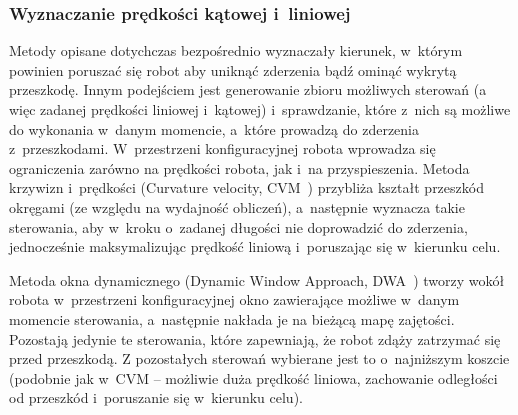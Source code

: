 \subsubsection{Wyznaczanie prędkości kątowej i~liniowej}

Metody opisane dotychczas bezpośrednio wyznaczały kierunek, w~którym powinien poruszać
się robot aby uniknąć zderzenia bądź ominąć wykrytą przeszkodę. Innym podejściem
jest generowanie zbioru możliwych sterowań (a więc zadanej prędkości liniowej i~kątowej)
i~sprawdzanie, które z~nich są możliwe do wykonania w~danym momencie, a~które prowadzą
do zderzenia z~przeszkodami. W~przestrzeni konfiguracyjnej robota wprowadza się ograniczenia
zarówno na prędkości robota, jak i~na przyspieszenia. Metoda krzywizn i~prędkości
(Curvature velocity, CVM~\cite{511023}) przybliża kształt przeszkód okręgami (ze względu na wydajność
obliczeń), a~następnie wyznacza takie sterowania, aby w~kroku o~zadanej długości
nie doprowadzić do zderzenia, jednocześnie maksymalizując prędkość liniową i~poruszając
się w~kierunku celu.

Metoda okna dynamicznego (Dynamic Window Approach, DWA~\cite{fox1997dynamic}) tworzy wokół robota w~przestrzeni
konfiguracyjnej okno zawierające możliwe w~danym momencie sterowania, a~następnie nakłada
je na bieżącą mapę zajętości. Pozostają jedynie te sterowania, które zapewniają,
że robot zdąży zatrzymać się przed przeszkodą. Z pozostałych sterowań wybierane jest
to o~najniższym koszcie (podobnie jak w~CVM -- możliwie duża prędkość liniowa,
zachowanie odległości od przeszkód i~poruszanie się w~kierunku celu).
